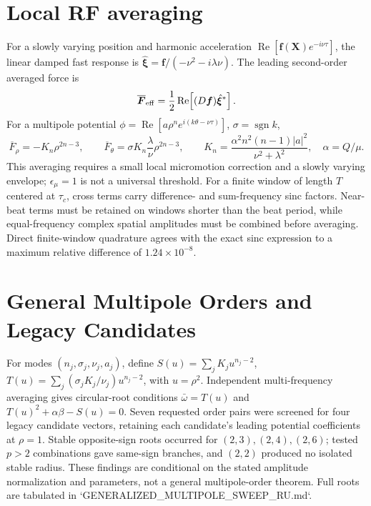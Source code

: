 \documentclass[11pt,a4paper]{article}
\begin{document}
\section{Local RF averaging}
For a slowly varying position and harmonic acceleration \(\operatorname{Re}[\bm f(\bm X)e^{-i\nu\tau}]\), the linear damped fast response is \(\hat{\bm\xi}=\bm f/(-\nu^2-i\lambda\nu)\). The leading second-order averaged force is
\begin{equation}
\overline{\bm F}_{\rm eff}=\frac12\operatorname{Re}\!\left[(D\bm f)\hat{\bm\xi}^{*}\right].
\end{equation}
For a multipole potential \(\phi=\operatorname{Re}[a\rho^ne^{i(k\theta-\nu\tau)}]\), \(\sigma=\operatorname{sgn}k\),
\begin{equation}
\overline F_\rho=-K_n\rho^{2n-3},\qquad
\overline F_\theta=\sigma K_n\frac{\lambda}{\nu}\rho^{2n-3},\qquad
K_n=\frac{\alpha^2n^2(n-1)|a|^2}{\nu^2+\lambda^2},\quad \alpha=Q/\mu.
\end{equation}
This averaging requires a small local micromotion correction and a slowly varying envelope; \(\epsilon_\mu=1\) is not a universal threshold.
For a finite window of length \(T\) centered at \(\tau_c\), cross terms carry difference- and sum-frequency sinc factors. Near-beat terms must be retained on windows shorter than the beat period, while equal-frequency complex spatial amplitudes must be combined before averaging. Direct finite-window quadrature agrees with the exact sinc expression to a maximum relative difference of \(1.24\times10^{-8}\).

\section{General Multipole Orders and Legacy Candidates}
For modes \((n_j,\sigma_j,\nu_j,a_j)\), define \(S(u)=\sum_jK_ju^{n_j-2}\), \(T(u)=\sum_j(\sigma_jK_j/\nu_j)u^{n_j-2}\), with \(u=\rho^2\). Independent multi-frequency averaging gives circular-root conditions \(\bar\omega=T(u)\) and \(T(u)^2+\alpha\beta-S(u)=0\). Seven requested order pairs were screened for four legacy candidate vectors, retaining each candidate's leading potential coefficients at \(\rho=1\). Stable opposite-sign roots occurred for \((2,3),(2,4),(2,6)\); tested \(p>2\) combinations gave same-sign branches, and \((2,2)\) produced no isolated stable radius. These findings are conditional on the stated amplitude normalization and parameters, not a general multipole-order theorem. Full roots are tabulated in `GENERALIZED_MULTIPOLE_SWEEP_RU.md`.
\end{document}
